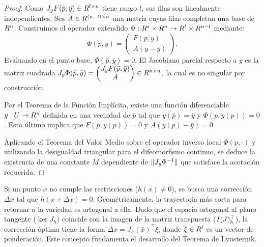 \begin{proof}
 Como $J_y F(\bar{p}, \bar{y}) \in R^{l \times n}$ tiene rango $l$, sus filas son linealmente independientes. Sea $A \in R^{(n-l) \times n}$ una matriz cuyas filas completan una base de $R^n$. Construimos el operador extendido $\Phi : R^s \times R^n \to R^l \times R^{n-l}$ mediante:
 \[
 \Phi(p, y) = \begin{pmatrix} F(p, y) \\ A(y - \bar{y}) \end{pmatrix}.
 \]
 Evaluando en el punto base, $\Phi(\bar{p}, \bar{y}) = 0$. El Jacobiano parcial respecto a $y$ es la matriz cuadrada $J_y \Phi(\bar{p}, \bar{y}) = \begin{pmatrix} J_y F(\bar{p}, \bar{y}) \\ A \end{pmatrix} \in R^{n \times n}$, la cual es no singular por construcción.
 
 Por el Teorema de la Función Implícita, existe una función diferenciable $y : U \to R^n$ definida en una vecindad de $\bar{p}$ tal que $y(\bar{p}) = \bar{y}$ y $\Phi(p, y(p)) = 0$. Esto último implica que $F(p, y(p)) = 0$ y $A(y(p) - \bar{y}) = 0$.
 
 Aplicando el Teorema del Valor Medio sobre el operador inverso local $\Phi(p, \cdot)$ y utilizando la desigualdad triangular para el difeomorfismo continuo, se deduce la existencia de una constante $M$ dependiente de $\lVert J_y \Phi^{-1}\rVert$ que satisface la acotación requerida.
\end{proof}

\begin{notabox}
 Si un punto $x$ no cumple las restricciones ($h(x) \neq 0$), se busca una corrección $\Delta x$ tal que $h(x + \Delta x) = 0$. Geométricamente, la trayectoria más corta para retornar a la variedad es ortogonal a ella. Dado que el espacio ortogonal al plano tangente ($\ker J_h$) coincide con la imagen de la matriz transpuesta ($I (J)_h^\top$), la corrección óptima tiene la forma $\Delta x = J_h(\bar{x})^\top \xi$, donde $\xi \in R^l$ es un vector de ponderación. Este concepto fundamenta el desarrollo del Teorema de Lyusternik.
\end{notabox}

